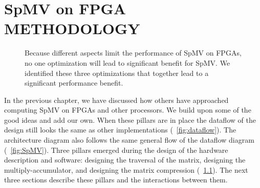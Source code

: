 \chapter{SpMV on FPGA METHODOLOGY}
\label{chp:method}

\begin{figure}
    \centering
    \caption{Because different aspects limit the performance of SpMV on FPGAs, no one optimization will lead to significant benefit for SpMV. We identified these three optimizations that together lead to a significant performance benefit.}
    \label{fig:pillars}
\end{figure}

In the previous chapter, we have discussed how others have approached computing SpMV on FPGAs and other processors. We build upon some of the good ideas and add our own. When these pillars are in place the dataflow of the design still looks the same as other implementations (\figurename~\ref{fig:dataflow}). The architecture diagram also follows the same general flow of the dataflow diagram (\figurename~\ref{fig:SpMV}).
Three pillars emerged during the design of the hardware description and software: designing the traversal of the matrix, designing the multiply-accumulator, and designing the matrix compression (\figurename~\ref{fig:pillars}). The next three sections describe these pillars and the interactions between them.

